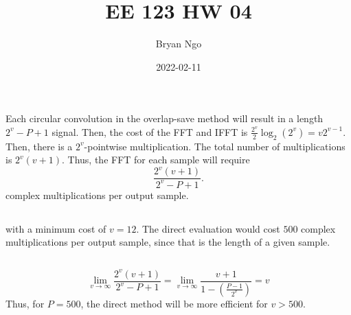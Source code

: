 \documentclass{article}
\title{EE 123 HW 04}
\author{Bryan Ngo}
\date{2022-02-11}
\begin{document}
\maketitle

\setcounter{section}{2}

\section{}

\subsection{}

Each circular convolution in the overlap-save method will result in a length \(2^v - P + 1\) signal.
Then, the cost of the FFT and IFFT is \(\frac{2^v}{2} \log_2(2^v) = v 2^{v - 1}\).
Then, there is a \(2^v\)-pointwise multiplication.
The total number of multiplications is \(2^v (v + 1)\).
Thus, the FFT for each sample will require
\begin{equation}
    \frac{2^v (v + 1)}{2^v - P + 1}.
\end{equation}
complex multiplications per output sample.

\subsection{}

\begin{center}
\end{center}
with a minimum cost of \(v = 12\).
The direct evaluation would cost \(500\) complex multiplications per output sample, since that is the length of a given sample.

\subsection{}

\begin{equation}
    \lim_{v \to \infty} \frac{2^v (v + 1)}{2^v - P + 1} = \lim_{v \to \infty} \frac{v + 1}{1 - \left(\frac{P - 1}{2^v}\right)} = v
\end{equation}
Thus, for \(P = 500\), the direct method will be more efficient for \(v > 500\).
\end{document}
